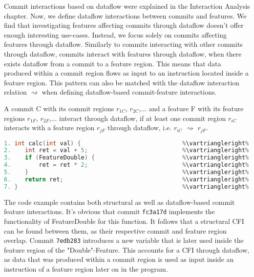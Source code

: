 Commit interactions based on dataflow were explained in the Interaction Analysis chapter.
Now, we define dataflow interactions between commits and features.
We find that investigating features affecting commits through dataflow doesn't offer enough interesting use-cases.
Instead, we focus solely on commits affecting features through dataflow.
Similarly to commits interacting with other commits through dataflow, commits interact with features through dataflow, when there exists dataflow from a commit to a feature region.
This means that data produced within a commit region flows as input to an instruction located inside a feature region.
This pattern can also be matched with the dataflow interaction relation $\rightsquigarrow$ when defining dataflow-based commit-feature interactions.

\begin{definition}
A commit C with its commit regions $r_{1C}$, $r_{2C}$,... and a feature F with its feature regions $r_{1F}$, $r_{2F}$,... interact through dataflow, if at least one commit region $r_{iC}$ interacts with a feature region $r_{jF}$ through dataflow, i.e. $r_{iC}$ $\rightsquigarrow$ $r_{jF}$.
\end{definition}

\begin{lstlisting}[language=C++, caption={Commit Feature Interactions}, label=DescriptiveLabel]	
1. int calc(int val) {                             %\vartriangleright% %\texttt{d93df4a}%
2.    int ret = val + 5;                           %\vartriangleright% %\texttt{7edb283}%
3.    if (FeatureDouble) {                         %\vartriangleright% %\texttt{fc3a17d}%    %\vartriangleright% %FeatureDouble%
4.        ret = ret * 2;                           %\vartriangleright% %\texttt{fc3a17d}%    %\vartriangleright% %FeatureDouble%
5.    }                                            %\vartriangleright% %\texttt{fc3a17d}%    %\vartriangleright% %FeatureDouble%
6.    return ret;                                  %\vartriangleright% %\texttt{d93df4a}%   
7. }                                               %\vartriangleright% %\texttt{d93df4a}%   
\end{lstlisting}

\textsf{The code example contains both structural as well as dataflow-based commit feature interactions.
It's obvious that commit \texttt{fc3a17d} implements the functionality of FeatureDouble for this function.
It follows that a structural CFI can be found between them, as their respective commit and feature region overlap.
Commit \texttt{7edb283} introduces a new variable that is later used inside the feature region of the "Double"-Feature. 
This accounts for a CFI through dataflow, as data that was produced within a commit region is used as input 
inside an instruction of a feature region later on in the program.} \\

